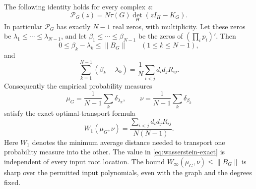 \begin{theorem}\label{thm:electrical}
The following identity holds for every complex $z$:
\begin{equation}\label{eq:compression-identity}
 \boxed{\quad\mathcal P_G(z)=N\tau(G)\det_H(zI_H-K_G).\quad}
\end{equation}
In particular $\mathcal P_G$ has exactly $N-1$ real zeros, with multiplicity.
Let these zeros be $\lambda_1\leq\cdots\leq\lambda_{N-1}$, and let
$\beta_1\leq\cdots\leq\beta_{N-1}$ be the zeros of
$(\prod_i p_i)'$.  Then
\begin{equation}\label{eq:root-upper-bound}
 0\leq\beta_k-\lambda_k\leq\|B_G\|\qquad(1\leq k\leq N-1),
\end{equation}
and
\begin{equation}\label{eq:resistance-sum}
 \boxed{\quad
 \sum_{k=1}^{N-1}(\beta_k-\lambda_k)
 =\frac1N\sum_{i<j}d_i d_jR_{ij}.
 \quad}
\end{equation}
Consequently the empirical probability measures
\[
 \mu_G=\frac1{N-1}\sum_k\delta_{\lambda_k},\qquad
 \nu=\frac1{N-1}\sum_k\delta_{\beta_k}
\]
satisfy the exact optimal-transport formula
\begin{equation}\label{eq:wasserstein-exact}
 \boxed{\quad W_1(\mu_G,\nu)
 =\frac{\sum_{i<j}d_i d_jR_{ij}}{N(N-1)}.\quad}
\end{equation}
Here $W_1$ denotes the minimum average distance needed to transport one
probability measure into the other.  The value in
\eqref{eq:wasserstein-exact} is independent of every input root location.
The bound $W_\infty(\mu_G,\nu)\leq\|B_G\|$ is sharp over the permitted
input polynomials, even with the graph and the degrees fixed.
\end{theorem}

